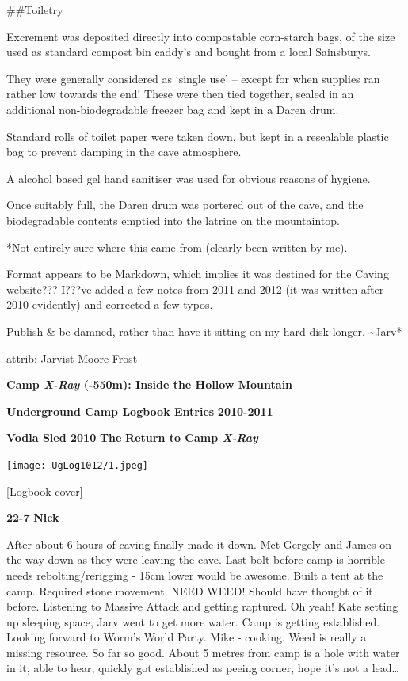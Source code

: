 \#\#Toiletry

Excrement was deposited directly into compostable corn-starch bags, of
the size used as standard compost bin caddy's and bought from a local
Sainsburys.

They were generally considered as `single use' -- except for when
supplies ran rather low towards the end! These were then tied together,
sealed in an additional non-biodegradable freezer bag and kept in a
Daren drum.

Standard rolls of toilet paper were taken down, but kept in a resealable
plastic bag to prevent damping in the cave atmosphere.

A alcohol based gel hand sanitiser was used for obvious reasons of
hygiene.

Once suitably full, the Daren drum was portered out of the cave, and the
biodegradable contents emptied into the latrine on the mountaintop.

*Not entirely sure where this came from (clearly been written by me).

Format appears to be Markdown, which implies it was destined for the
Caving website??? I???ve added a few notes from 2011 and 2012 (it was
written after 2010 evidently) and corrected a few typos.

Publish \& be damned, rather than have it sitting on my hard disk
longer. \textasciitilde{}Jarv*

attrib: Jarvist Moore Frost

\textbf{Camp \emph{X-Ray} (-550m): Inside the Hollow Mountain}

\textbf{Underground Camp Logbook Entries} \textbf{2010-2011}

\textbf{Vodla Sled 2010} \textbf{The} \textbf{Return to Camp
\emph{X-Ray}}

\texttt{[image: UgLog1012/1.jpeg]}

{[}Logbook cover{]}

\textbf{22-7} \textbf{Nick}

After about 6 hours of caving finally made it down. Met Gergely and
James on the way down as they were leaving the cave. Last bolt before
camp is horrible - needs rebolting/rerigging - 15cm lower would be
awesome. Built a tent at the camp. Required stone movement. NEED WEED!
Should have thought of it before. Listening to Massive Attack and
getting raptured. Oh yeah! Kate setting up sleeping space, Jarv went to
get more water. Camp is getting established. Looking forward to Worm's
World Party. Mike - cooking. Weed is really a missing resource. So far
so good. About 5 metres from camp is a hole with water in it, able to
hear, quickly got established as peeing corner, hope it's not a
lead\ldots{}

